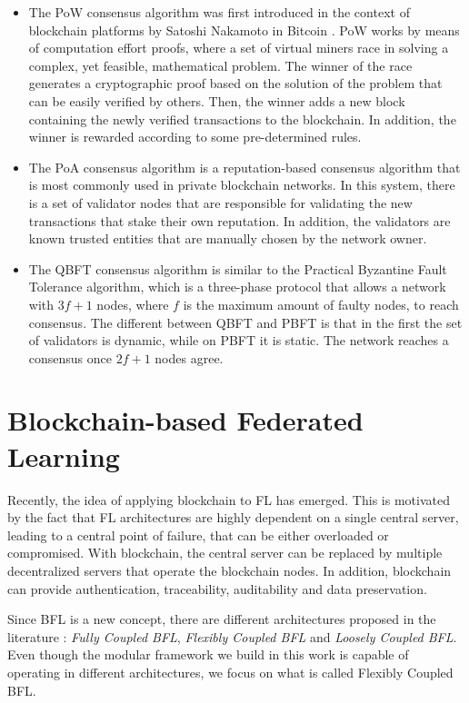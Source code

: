 \begin{itemize}
    \item The PoW consensus algorithm was first introduced in the context of blockchain platforms by Satoshi Nakamoto in Bitcoin \cite{nakamoto2009bitcoin}. PoW works by means of computation effort proofs, where a set of virtual miners race in solving a complex, yet feasible, mathematical problem. The winner of the race generates a cryptographic proof based on the solution of the problem that can be easily verified by others. Then, the winner adds a new block containing the newly verified transactions to the blockchain. In addition, the winner is rewarded according to some pre-determined rules.
    
    \item The PoA consensus algorithm is a reputation-based consensus algorithm that is most commonly used in private blockchain networks. In this system, there is a set of validator nodes that are responsible for validating the new transactions that stake their own reputation. In addition, the validators are known trusted entities that are manually chosen by the network owner.

    \item The QBFT \cite{10.48550/arxiv.2002.03613} consensus algorithm is similar to the Practical Byzantine Fault Tolerance algorithm, which is a three-phase protocol that allows a network with $3f+1$ nodes, where $f$ is the maximum amount of faulty nodes, to reach consensus. The different between QBFT and PBFT is that in the first the set of validators is dynamic, while on PBFT it is static. The network reaches a consensus once $2f+1$ nodes agree.
\end{itemize}

\section{Blockchain-based Federated Learning}\label{background:bfl}

Recently, the idea of applying blockchain to FL has emerged. This is motivated by the fact that FL architectures are highly dependent on a single central server, leading to a central point of failure, that can be either overloaded or compromised. With blockchain, the central server can be replaced by multiple decentralized servers that operate the blockchain nodes. In addition, blockchain can provide authentication, traceability, auditability and data preservation.

Since BFL is a new concept, there are different architectures proposed in the literature \cite{10.48550/arxiv.2110.02182}: \textit{Fully Coupled BFL}, \textit{Flexibly Coupled BFL} and \textit{Loosely Coupled BFL}. Even though the modular framework we build in this work is capable of operating in different architectures, we focus on what is called Flexibly Coupled BFL.

